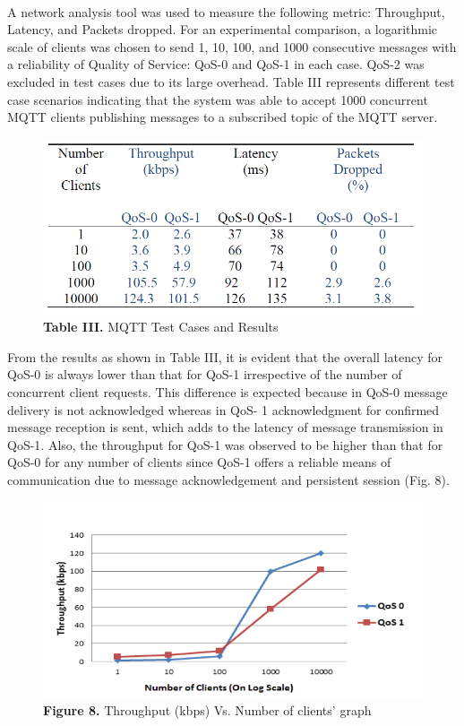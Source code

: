 \documentclass[a4paper,12pt,oneside]{article}
\let\counterwithin\relax
\begin{document}
\paragraph{}
A network analysis tool was used to measure the following
metric: Throughput, Latency, and Packets dropped. For
an experimental comparison, a logarithmic scale of clients was
chosen to send 1, 10, 100, and 1000 consecutive messages
with a reliability of Quality of Service: QoS-0 and QoS-1 in
each case. QoS-2 was excluded in test cases due to its large
overhead. Table III represents different test case scenarios
indicating that the system was able to accept 1000 concurrent
MQTT clients publishing messages to a subscribed topic of
the MQTT server. 
\newline
    \begin{figure}[H]
    \includegraphics{Table3.png}
    \centering
    \caption{\textbf{Table III.} MQTT Test Cases and Results}
    \end{figure}
\newpage
From the results as shown in Table III, it is
evident that the overall latency for QoS-0 is always lower than
that for QoS-1 irrespective of the number of concurrent client
requests. This difference is expected because in
QoS-0 message delivery is not acknowledged whereas in QoS-
1 acknowledgment for confirmed message reception is sent,
which adds to the latency of message transmission in QoS-1.
Also, the throughput for QoS-1 was observed to be higher than
that for QoS-0 for any number of clients since QoS-1 offers a
reliable means of communication due to message
acknowledgement and persistent session (Fig. 8).
    \begin{figure}[H]
    \includegraphics{Figure8.png}
    \centering
    \caption{\textbf{Figure 8.} Throughput (kbps) Vs. Number of clients’ graph}
    \end{figure}
\end{document}
